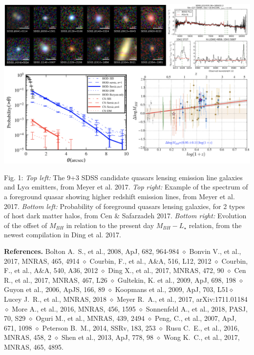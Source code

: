 \documentclass[a4paper,11pt]{article}
\begin{document}
\begin{minipage}{\textwidth}
\includegraphics[width=0.95\hsize]{collage.eps}
\end{minipage}
Fig. 1: {\it Top left:} The 9+3 SDSS candidate quasars lensing emission line galaxies and Ly$\alpha$ emitters, from Meyer et al. 2017. {\it Top right:} Example of the spectrum of a foreground quasar showing higher redshift emission lines, from Meyer et al. 2017. {\it Bottom left:} Probability of foreground quasars lensing galaxies, for 2 types of host dark matter halos, from Cen \& Safarzadeh 2017. {\it Bottom right:} Evolution of the offset of $M_{BH}$ in relation to the present day $M_{BH} - L_{\star}$ relation, from the newest compilation in Ding et al. 2017. 
  
{\bf References.} Bolton A.~S., et al., 2008, ApJ, 682, 964-984 $\diamond$ Bonvin V., et al., 2017, MNRAS, 465, 4914 $\diamond$ Courbin, F., et al., A\&A, 516, L12, 2012 $\diamond$ Courbin, F., et al., A\&A, 540, A36, 2012 $\diamond$ Ding X., et al., 2017, MNRAS, 472, 90 $\diamond$ Cen R., et al., 2017, MNRAS, 467, L26 $\diamond$ Gultekin, K. et al., 2009, ApJ, 698, 198 $\diamond$ Guyon et al., 2006, ApJS, 166, 89 $\diamond$ Koopmans et al., 2009, ApJ, 703, L51$\diamond$ Lucey J.~R., et al., MNRAS, 2018 $\diamond$ Meyer R.~A., et al., 2017, arXiv:1711.01184 $\diamond$ More A., et al., 2016, MNRAS, 456, 1595 $\diamond$ Sonnenfeld A., et al., 2018, PASJ, 70, S29 $\diamond$ Oguri M., et al., MNRAS, 439, 2494 $\diamond$ Peng, C., et al., 2007, ApJ, 671, 1098 $\diamond$ Peterson B.~M., 2014, SSRv, 183, 253 $\diamond$ Rusu C.~E., et al., 2016, MNRAS, 458, 2 $\diamond$ Shen et al., 2013, ApJ, 778, 98 $\diamond$ Wong K.~C., et al., 2017, MNRAS, 465, 4895.
\end{document}

